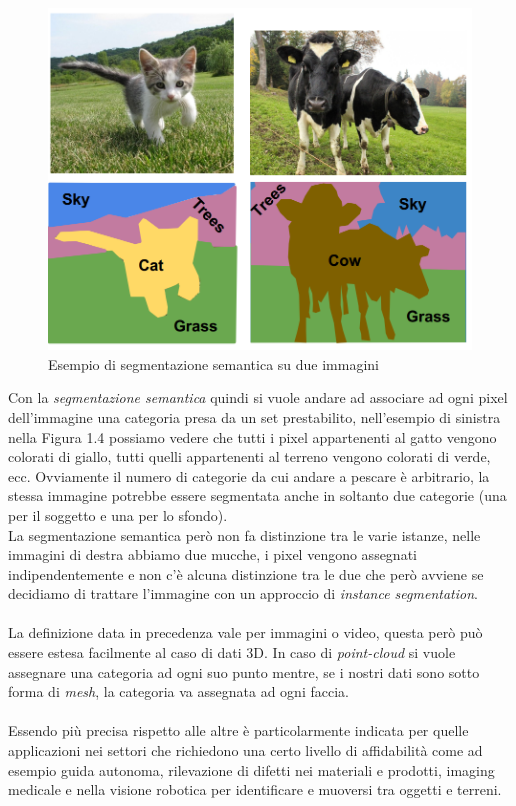 \begin{figure}[h!]
	\centering
	\includegraphics[width=1\linewidth]{../immagini/semantic_segmentation}
	\caption[Segmentazione semantica]{Esempio di segmentazione semantica su due immagini }
	\label{fig:types}
\end{figure}
Con la \textit{segmentazione semantica} quindi si vuole andare ad associare ad ogni pixel dell'immagine una categoria presa da un set prestabilito, nell'esempio di sinistra nella Figura 1.4 possiamo vedere che tutti i pixel appartenenti al gatto vengono colorati di giallo, tutti quelli appartenenti al terreno vengono colorati di verde, ecc. Ovviamente il numero di categorie da cui andare a pescare è arbitrario, la stessa immagine potrebbe essere segmentata anche in soltanto due categorie (una per il soggetto e una per lo sfondo). \\
La segmentazione semantica però non fa distinzione tra le varie istanze, nelle immagini di destra abbiamo due mucche, i pixel vengono assegnati indipendentemente e non c'è alcuna distinzione tra le due che però avviene se decidiamo di trattare l'immagine con un approccio di \textit{instance segmentation}.\\\\
La definizione data in precedenza vale per immagini o video, questa però può essere estesa facilmente al caso di dati 3D. In caso di \textit{point-cloud} si vuole assegnare una categoria ad ogni suo punto mentre, se i nostri dati sono sotto forma di \textit{mesh}, la categoria va assegnata ad ogni faccia.\\\\
Essendo più precisa rispetto alle altre è particolarmente indicata per quelle applicazioni nei settori che richiedono una certo livello di affidabilità come ad esempio guida autonoma, rilevazione di difetti nei materiali e prodotti, imaging medicale e nella visione robotica per identificare e muoversi tra oggetti e terreni. 
